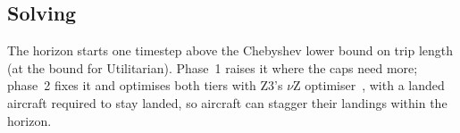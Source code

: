 \subsection{Solving}
\label{sec:solving}

The horizon starts one timestep above the Chebyshev lower bound on trip length (at the
bound for Utilitarian). Phase~1 raises it where the caps need more; phase~2 fixes it and
optimises both tiers with Z3's $\nu$Z optimiser~\cite{demoura2008z3,bjorner2015nuz}, with
a landed aircraft required to stay landed, so aircraft can stagger their landings within
the horizon.
